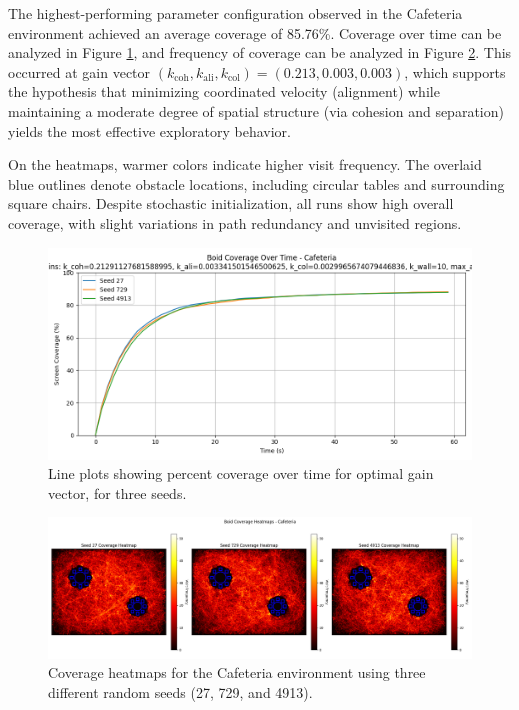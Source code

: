 \documentclass[12pt]{article}
\begin{document}
\begin{linenumbers}
The highest-performing parameter configuration observed in the Cafeteria environment achieved an average coverage of 85.76\%. Coverage over time can be analyzed in Figure \ref{fig:caf_cov}, and frequency of coverage can be analyzed in Figure \ref{fig:caf_heatmap}. This occurred at gain vector \((k_\text{coh}, k_\text{ali}, k_\text{col}) = (0.213, 0.003, 0.003)\), which supports the hypothesis that minimizing coordinated velocity (alignment) while maintaining a moderate degree of spatial structure (via cohesion and separation) yields the most effective exploratory behavior. 

On the heatmaps, warmer colors indicate higher visit frequency. The overlaid blue outlines denote obstacle locations, including circular tables and surrounding square chairs. Despite stochastic initialization, all runs show high overall coverage, with slight variations in path redundancy and unvisited regions.

\begin{figure}[h!]
    \centering
    \includegraphics[width=0.7\linewidth]{caf_cov.png}
    \caption{Line plots showing percent coverage over time for optimal gain vector, for three seeds.}
    \label{fig:caf_cov}
  \end{figure}

\begin{figure}[h!]
\centering
\includegraphics[width=\linewidth]{caf_heatmap.png}
\caption{Coverage heatmaps for the Cafeteria environment using three different random seeds (27, 729, and 4913).}
\label{fig:caf_heatmap}
\end{figure}


\end{linenumbers}
\end{document}
